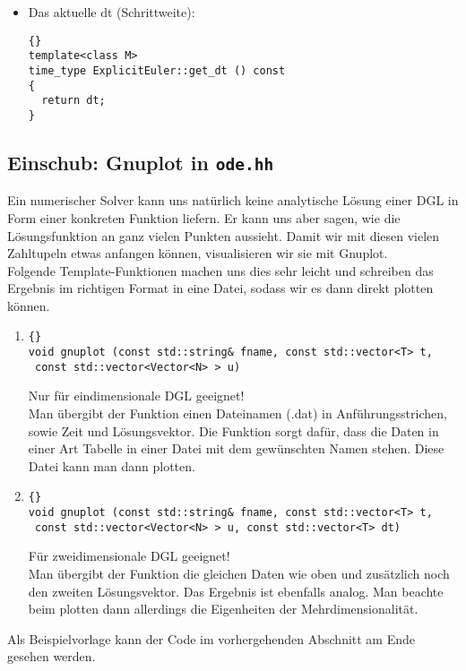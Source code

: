 \documentclass[a4paper,11pt]{article}
\theoremstyle{definition}
\begin{document}
\begin{itemize}
\item Das aktuelle dt (Schrittweite):
{\footnotesize{\begin{lstlisting}{}
template<class M>
time_type ExplicitEuler::get_dt () const
{
  return dt;
}
\end{lstlisting}}}
\end{itemize}

\subsection{Einschub: Gnuplot in \lstinline{ode.hh}}
Ein numerischer Solver kann uns natürlich keine analytische Lösung einer DGL in Form einer konkreten Funktion liefern. Er kann uns aber sagen, wie die Lösungsfunktion an ganz vielen Punkten aussieht. Damit wir mit diesen vielen Zahltupeln etwas anfangen können, visualisieren wir sie mit Gnuplot.\\
Folgende Template-Funktionen machen uns dies sehr leicht und schreiben das Ergebnis im richtigen Format in eine Datei, sodass wir es dann direkt plotten können.
\begin{enumerate}
\item 
{\footnotesize{\begin{lstlisting}{}
void gnuplot (const std::string& fname, const std::vector<T> t,
 const std::vector<Vector<N> > u)
\end{lstlisting}}}
Nur für eindimensionale DGL geeignet! \\
Man übergibt der Funktion einen Dateinamen (.dat) in Anführungsstrichen, sowie Zeit und Lösungsvektor. Die Funktion sorgt dafür, dass die Daten in einer Art Tabelle in einer Datei mit dem gewünschten Namen stehen. Diese Datei kann man dann plotten.
\item
{\footnotesize{\begin{lstlisting}{}
void gnuplot (const std::string& fname, const std::vector<T> t,
 const std::vector<Vector<N> > u, const std::vector<T> dt)
\end{lstlisting}}}
Für zweidimensionale DGL geeignet! \\
Man übergibt der Funktion die gleichen Daten wie oben und zusätzlich noch den zweiten Lösungsvektor. Das Ergebnis ist ebenfalls analog. Man beachte beim plotten dann allerdings die Eigenheiten der Mehrdimensionalität.
\end{enumerate}

Als Beispielvorlage kann der Code im vorhergehenden Abschnitt am Ende gesehen werden.
\end{document}

